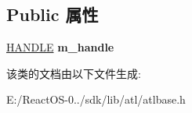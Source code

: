 \subsection*{Public 属性}
\begin{DoxyCompactItemize}
\item 
\mbox{\label{class_a_t_l_1_1_c_handle_a5edac4c6c3209c34e7ccd794655541b8}} 
\hyperlink{interfacevoid}{H\+A\+N\+D\+LE} {\bfseries m\+\_\+handle}
\end{DoxyCompactItemize}


该类的文档由以下文件生成\+:\begin{DoxyCompactItemize}
\item 
E\+:/\+React\+O\+S-\/0../sdk/lib/atl/atlbase.\+h\end{DoxyCompactItemize}
